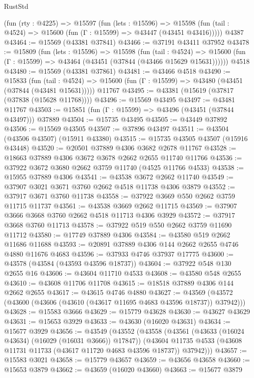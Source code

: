 \begin{lexlean}{RustStd}
\begin{coremodule}
    (fun (rty : @4225) =>
    @15597
      (fun (lets : @15596) =>
      @15598 (fun (tail : @4524) => @15600 (fun (Γ : @15599) => @43447 (@43451 @43416)))))
    @4387
@43464 := @15569 (@43381 @37841)
@43466 := @37191 @43411 @37952
@43478 := @15809
    (fun (lets : @15596) =>
    @15598
      (fun (tail : @4524) =>
      @15600 (fun (Γ : @15599) => @43464 (@43451 (@37844 (@43466 @15629 @15631))))))
    @4518
@43480 := @15569 (@43381 @37861)
@43481 := @43466 @4518
@43490 := @15833
    (fun (tail : @4524) => @15600 (fun (Γ : @15599) => @43480 (@43451 (@37844 (@43481 @15631)))))
    @11767
@43495 := @43381 (@15619 (@37817 (@37838 (@15628 @11768))))
@43496 := @15569 @43495
@43497 := @43481 @11767
@43503 := @15851 (fun (Γ : @15599) => @43496 (@43451 (@37844 @43497))) @37889
@43504 := @15735 @43495
@43505 := @43449 @37892
@43506 := @15569 @43505
@43507 := @37896 @43497
@43511 := @43504 (@43506 @43507) (@15911 @43380)
@43515 := @15735 @43505 @43507 (@15916 @43448)
@43520 := @20501 @37889 @4306 @3682 @2678 @11767
@43528 := @18663 @37889 @4306 @3672 @3678 @2662 @2655 @11740 @11766
@43536 := @37922 @3672 @3680 @2662 @3759 @11740 (@4525 @11766 @4533)
@43538 := @15955 @37889 @4306
@43541 := @43538 @3672 @2662 @11740
@43549 := @37907 @3021 @3671 @3760 @2662 @4518 @11738 @4306 @3879
@43552 := @37917 @3671 @3760 @11738
@43558 := @37922 @3669 @550 @2662 @3759 @11715 @11737
@43561 := @43538 @3669 @2662 @11715
@43569 := @37907 @3666 @3668 @3760 @2662 @4518 @11713 @4306 @3929
@43572 := @37917 @3668 @3760 @11713
@43578 := @37922 @519 @550 @2662 @3759 @11690 @11712
@43580 := @17749 @37889 @4306
@43584 := @43580 @519 @2662 @11686 @11688
@43593 := @20891 @37889 @4306 @144 @2662 @2655 @4746 @4880 @11676 @4683
@43596 := @37933 @4746 @37937 @17775
@43600 := @43578 (@43584 (@43593 @43596 @18737))
@43604 := @37922 @548 @130 @2655 @16
@43606 := @43604 @11710 @4533
@43608 := @43580 @548 @2655
@43610 := @43608 @11706 @11708
@43615 := @18518 @37889 @4306 @144 @2662 @2655
@43617 := @43615 @4746 @4880
@43627 := @43569 (@43572 (@43600 (@43606 (@43610 (@43617 @11695 @4683 @43596 @18737)) @37942)))
@43628 := @15583 @3666
@43629 := @15779 @43628
@43630 := @43627 @43629
@43631 := @15653 @3929
@43633 := @43630 (@16020 @43631)
@43634 := @15677 @3929
@43656 := @43549
    (@43552
      (@43558
        (@43561 (@43633 (@16024 @43634) (@16029 (@16031 @3666)) @17847))
        (@43604 @11735 @4533 (@43608 @11731 @11733 (@43617 @11720 @4683 @43596 @18737)) @37942)))
@43657 := @15583 @3021
@43658 := @15779 @43657
@43659 := @43656 @43658
@43660 := @15653 @3879
@43662 := @43659 (@16020 @43660)
@43663 := @15677 @3879

\end{coremodule}
\end{lexlean}
